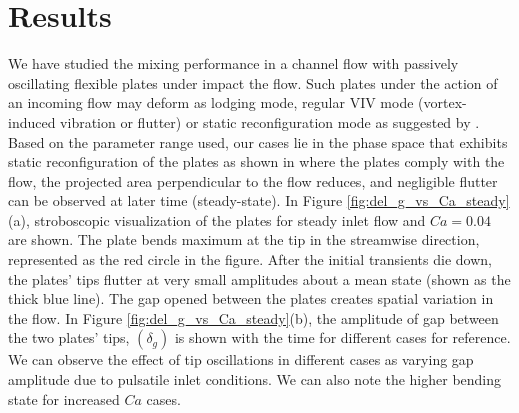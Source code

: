 \documentclass[%
 aip,
 amsmath,amssymb,
 reprint,
]{revtex4-1}
\begin{document}
\section{Results}
We have studied the mixing performance in a channel flow with passively oscillating flexible plates under impact the flow. Such plates under the action of an incoming flow may deform as lodging mode, regular VIV mode (vortex-induced vibration or flutter) or static reconfiguration mode as suggested by \cite{Zhang2020}. Based on the parameter range used, our cases lie in the phase space that exhibits static reconfiguration of the plates as shown in \cite{Zhang2020} where the plates comply with the flow, the projected area perpendicular to the flow reduces, and negligible flutter can be observed at later time (steady-state). In Figure \ref{fig:del_g_vs_Ca_steady}(a), stroboscopic visualization of the plates for steady inlet flow and $Ca=0.04$ are shown. The plate bends maximum at the tip in the streamwise direction, represented as the red circle in the figure. After the initial transients die down, the plates' tips flutter at very small amplitudes about a mean state (shown as the thick blue line). The gap opened between the plates creates spatial variation in the flow. In Figure \ref{fig:del_g_vs_Ca_steady}(b), the amplitude of gap between the two plates' tips, $(\delta_g)$ is shown with the time for different cases for reference. We can observe the effect of tip oscillations in different cases as varying gap amplitude due to pulsatile inlet conditions. We can also note the higher bending state for increased $Ca$ cases.
\end{document}
